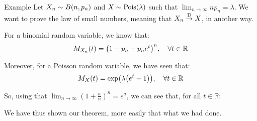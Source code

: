 \documentclass[a4paper]{article}
\begin{document}
\begin{parag}{Example}
    Let $X_n \followsdistr B\left(n, p_n\right)$ and $X \followsdistr \text{Pois}\left(\lambda\right)$ such that $\lim_{n \to \infty} n p_n = \lambda$. We want to prove the law of small numbers, meaning that $X_n \over{\to}{D} X$, in another way.

    For a binomial random variable, we know that: 
    \[M_{X_n}\left(t\right) = \left(1 - p_n + p_n e^t\right)^{n}, \mathspace \forall t \in \mathbb{R}\]
    
    Moreover, for a Poisson random variable, we have seen that: 
    \[M_X\left(t\right) = \exp\left(\lambda\left(e^t - 1\right)\right), \mathspace \forall t \in \mathbb{R}\]
    
    So, using that $\lim_{n \to \infty} \left(1 + \frac{a}{n}\right)^n = e^a$, we can see that, for all $t \in \mathbb{R}$: 
    
    We have thus shown our theorem, more easily that what we had done.
\end{parag}
\end{document}
